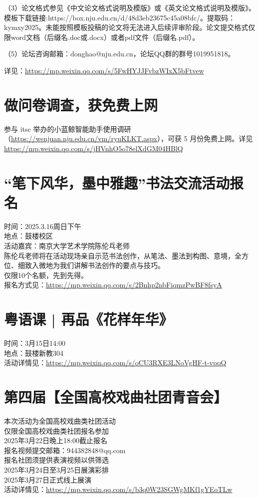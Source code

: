 \documentclass[letterpaper, 12pt]{article}
\begin{document}
\begin{multicols}{2}
 （3）论文格式参见《中文论文格式说明及模版》或《英文论文格式说明及模版》。模板下载链接:https://box.nju.edu.cn/d/48d3eb23675c45a08bfc/。提取码：kymxy2025。未能按照模板投稿的论文将无法进入后续评审阶段。论文提交格式仅限word文档（后缀名.doc或.docx）或者pdf文件（后缀名.pdf）。
 
（5）论坛咨询邮箱：donghao@nju.edu.cn，论坛QQ群的群号1019951818。

详见：\url{https://mp.weixin.qq.com/s/5FwHYJJFvbzWIxX5bFtvew}
\section{做问卷调查，获免费上网}
参与 itsc 举办的小蓝鲸智能助手使用调研（\url{https://wenjuan.nju.edu.cn/vm/ryuKLKT.aspx}），可获 5 月份免费上网。详见\url{https://mp.weixin.qq.com/s/jHVnhO5o78elXdGM04HBlQ}

\section{“笔下风华，墨中雅趣”书法交流活动报名}
时间：2025.3.16周日下午\\
地点：鼓楼校区\\
活动嘉宾：南京大学艺术学院陈伦乓老师\\
陈伦乓老师将在活动现场亲自示范书法创作，从笔法、墨法到构图、意境，全方位、细致入微地为我们讲解书法创作的要点与技巧。\\
仅限10个名额，先到先得。\\
报名方式见：\url{https://mp.weixin.qq.com/s/2Bnhp2nbFiqmzPwBF8fsyA}

\section{粤语课 | 再品《花样年华》}
时间：3月15日14:00\\
地点：鼓楼新教304\\
活动详情见：\url{https://mp.weixin.qq.com/s/oCU3RXE3LNoVgHF-t-vpqQ}

\section{第四届【全国高校戏曲社团青音会】}
本次活动为全国高校戏曲类社团活动\\
仅限全国高校戏曲类社团报名参加\\
2025年3月22日晚上18:00截止报名\\
报名视频提交邮箱：944382848@qq.com\\
报名社团须提供表演视频以供筛选\\
2025年3月24日至3月25日展演彩排\\
2025年3月27日正式线上展演\\
活动详情见：\url{https://mp.weixin.qq.com/s/b3q0W23SGWgMKf1gYEoTLw}


\end{multicols}
\end{document}
